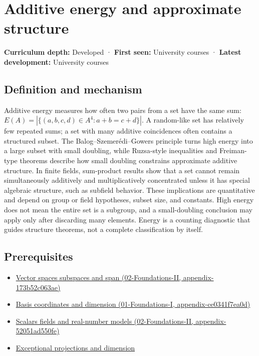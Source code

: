 \hypertarget{appendix-b0732b22e7d6}{}
\section{Additive energy and approximate structure}\label{appendix-b0732b22e7d6-additive-energy-and-approximate-structure}

\textbf{Curriculum depth:} Developed · \textbf{First seen:} University courses · \textbf{Latest development:} University courses

\subsection{Definition and mechanism}\label{appendix-b0732b22e7d6-definition-and-mechanism}

Additive energy measures how often two pairs from a set have the same sum: \(E(A)=|\{(a,b,c,d)\in A^4:a+b=c+d\}|\). A random-like set has relatively few repeated sums; a set with many additive coincidences often contains a structured subset. The Balog--Szemerédi--Gowers principle turns high energy into a large subset with small doubling, while Ruzsa-style inequalities and Freiman-type theorems describe how small doubling constrains approximate additive structure. In finite fields, sum-product results show that a set cannot remain simultaneously additively and multiplicatively concentrated unless it has special algebraic structure, such as subfield behavior. These implications are quantitative and depend on group or field hypotheses, subset size, and constants. High energy does not mean the entire set is a subgroup, and a small-doubling conclusion may apply only after discarding many elements. Energy is a counting diagnostic that guides structure theorems, not a complete classification by itself.

\subsection{Prerequisites}\label{appendix-b0732b22e7d6-prerequisites}

\begin{itemize}
\tightlist
\item
  \href{../02-Foundations-II/main.pdf\#nameddest=appendix-173b52c063ae}{Vector spaces subspaces and span (02-Foundations-II, appendix-173b52c063ae)}
\item
  \href{../01-Foundations-I/main.pdf\#nameddest=appendix-ce0341f7ea0d}{Basis coordinates and dimension (01-Foundations-I, appendix-ce0341f7ea0d)}
\item
  \href{../02-Foundations-II/main.pdf\#nameddest=appendix-52051ad550fe}{Scalars fields and real-number models (02-Foundations-II, appendix-52051ad550fe)}
\item
  \hyperref[appendix-3c73f7862157]{Exceptional projections and dimension}
\end{itemize}


